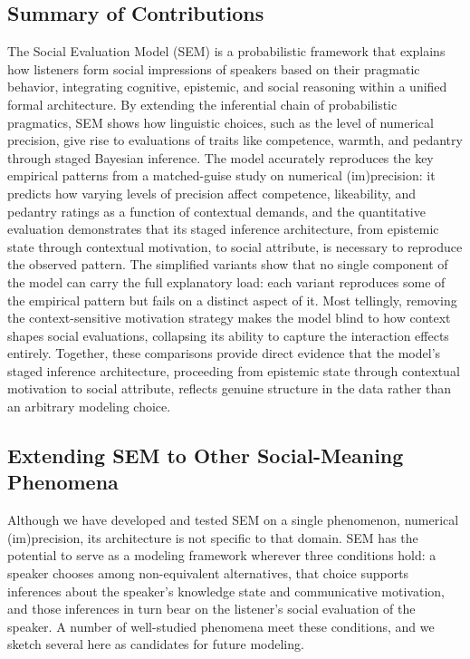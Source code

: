 \documentclass[12pt,a4paper]{article}
\begin{document}
\subsection{Summary of Contributions}

The Social Evaluation Model (SEM) is a probabilistic framework that explains
how listeners form social impressions of speakers based on their pragmatic
behavior, integrating cognitive, epistemic, and social reasoning within a
unified formal architecture. By extending the inferential chain of probabilistic
pragmatics, SEM shows how linguistic choices, such as the level of numerical
precision, give rise to evaluations of traits like competence, warmth, and
pedantry through staged Bayesian inference. The model accurately reproduces the
key empirical patterns from a matched-guise study on numerical (im)precision: it
predicts how varying levels of precision affect competence, likeability, and
pedantry ratings as a function of contextual demands, and the quantitative
evaluation demonstrates that its staged inference architecture, from epistemic
state through contextual motivation, to social attribute, is necessary to
reproduce the observed pattern. The simplified variants show that no single component of the model can carry
the full explanatory load: each variant reproduces some of the empirical
pattern but fails on a distinct aspect of it. Most tellingly, removing the
context-sensitive motivation strategy makes the model blind to how context
shapes social evaluations, collapsing its ability to capture the interaction
effects entirely. Together, these comparisons provide direct evidence that the
model's staged inference architecture, proceeding from epistemic state through
contextual motivation to social attribute, reflects genuine structure in the
data rather than an arbitrary modeling choice.

\subsection{Extending SEM to Other Social-Meaning Phenomena}
\label{sem-extension}

Although we have developed and tested SEM on a single phenomenon, numerical
(im)precision, its architecture is not specific to that domain. SEM has the 
potential to serve as a modeling framework wherever three
conditions hold: a speaker chooses among non-equivalent alternatives, that
choice supports inferences about the speaker's knowledge state and communicative
motivation, and those inferences in turn bear on the listener's social
evaluation of the speaker. A number of well-studied
phenomena meet these conditions, and we sketch several here as candidates for
future modeling.
\end{document}
